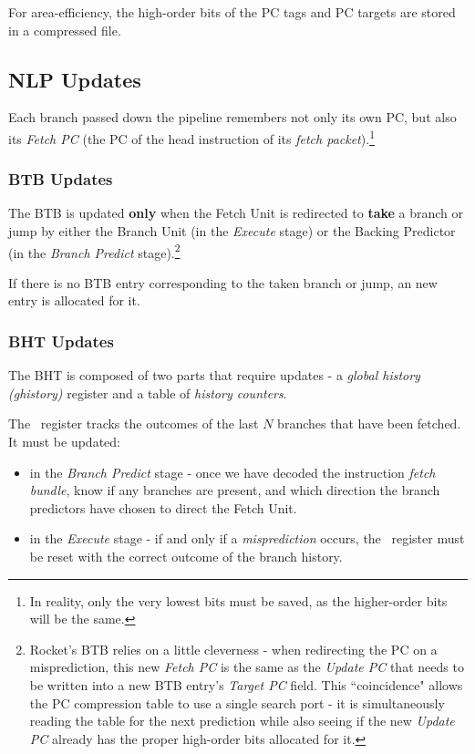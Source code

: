 For area-efficiency, the high-order bits of the PC tags and PC targets are stored in a compressed file.


\subsection{NLP Updates}

Each branch passed down the pipeline remembers not only its own PC, but also its {\em Fetch PC} (the PC of the head instruction of its {\em fetch packet}).\footnote{In reality, only the very lowest bits must be saved, as the higher-order bits will be the same.}  



\subsubsection{BTB Updates}

The BTB is updated {\bf only} when the Fetch Unit is redirected to {\bf take} a branch or jump by either the Branch Unit (in the {\em Execute} stage) or the Backing Predictor (in the {\em Branch Predict} stage).\footnote{Rocket's BTB relies on a little cleverness - when redirecting the PC on a misprediction, this new {\em Fetch PC } is the same as the {\em Update PC} that needs to be written into a new BTB entry's {\em Target PC} field. This ``coincidence" allows the PC compression table to use a single search port - it is simultaneously reading the table for the next prediction while also seeing if the new {\em Update PC} already has the proper high-order bits allocated for it.}

If there is no BTB entry corresponding to the taken branch or jump, an new entry is allocated for it.

\subsubsection{BHT Updates}

The BHT is composed of two parts that require updates - a {\em global history (ghistory)} register and a table of {\em history counters}. 

The \ghistory\ register tracks the outcomes of the last $N$ branches that have been fetched. It must be updated:

\begin{itemize}
\item in the {\em Branch Predict} stage - once we have decoded the instruction {\em fetch bundle}, know if any branches are present, and which direction the branch predictors have chosen to direct the Fetch Unit.
\item in the {\em Execute} stage - if and only if a {\em misprediction} occurs, the \ghistory\ register must be reset with the correct outcome of the branch history.
\end{itemize}

